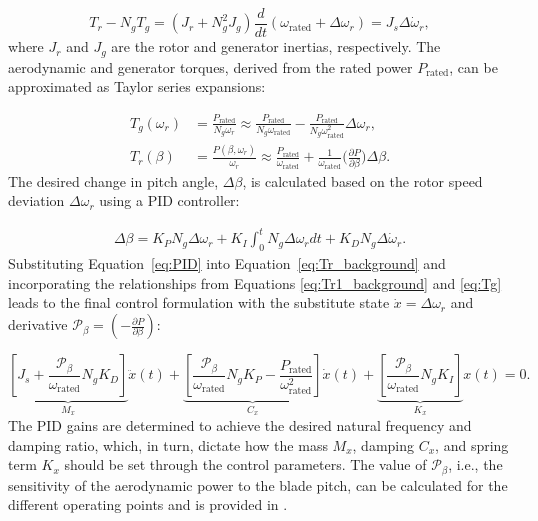 \begin{equation} \label{eq:Tr1_background}
    T_r -N_g T_g = (J_r + N_g^2 J_g) \frac{d}{dt}(\omega_{\text{rated}} + \Delta \omega_r) = J_{s} \Delta \dot{\omega}_r,
\end{equation}
where $J_r$ and $J_g$ are the rotor and generator inertias, respectively. The aerodynamic and generator torques, derived from the rated power $P_{\text{rated}}$, can be approximated as Taylor series expansions:

\begin{align}
    T_g(\omega_r) &= \frac{P_{\text{rated}}}{N_g \omega_r} \approx  \frac{P_{\text{rated}}}{N_g \omega_{\text{rated}}} - \frac{P_{\text{rated}}}{N_g\omega_{\text{rated}}^2} \Delta \omega_r,  \label{eq:Tg}\\
    T_r(\beta) &= \frac{P(\beta,\omega_r)}{\omega_r}   \approx \frac{P_{\text{rated}}}{\omega_{\text{rated}}} + \frac{1}{\omega_{\text{rated}}}\Big(\frac{\partial P}{\partial \beta}\Big) \Delta \beta.  \label{eq:Tr_background}
\end{align}
%
The desired change in pitch angle, $\Delta \beta$, is calculated based on the rotor speed deviation $\Delta \omega_r$ using a PID controller:

\begin{align} \label{eq:PID}
    \Delta \beta = K_P N_g \Delta \omega_r + K_I \int_{0}^{t}N_g \Delta \omega_r dt + K_D N_g \Delta \dot{\omega}_r.
\end{align}
%
Substituting Equation~\eqref{eq:PID} into Equation~\eqref{eq:Tr_background} and incorporating the relationships from Equations \eqref{eq:Tr1_background} and \eqref{eq:Tg} leads to the final control formulation with the substitute state $\dot{x} = \Delta \omega_r$ and derivative $\mathcal{P}_\beta = \left( -\frac{\partial P}{\partial \beta} \right)$:

\begin{equation}\label{eq:PID2} 
    \underbrace{\left[ J_{s} + \frac{\mathcal{P}_\beta}{\omega_{\text{rated}}} N_{g} K_D \right]}_{M_{x}} \ddot{x}(t) 
    + \underbrace{\left[ \frac{\mathcal{P}_\beta}{\omega_{\text{rated}}} N_{g} K_P - \frac{P_{\text{rated}}}{\omega_{\text{rated}}^2} \right]}_{C_{x}} \dot{x} (t)
    + \underbrace{\left[ \frac{\mathcal{P}_\beta}{\omega_{\text{rated}}} N_{g} K_I \right]}_{K_{x}} x(t) = 0.
\end{equation}
%
The PID gains are determined to achieve the desired natural frequency and damping ratio, which, in turn, dictate how the mass $M_{x}$, damping $C_{x}$, and spring term $K_{x}$ should be set through the control parameters. The value of  $\mathcal{P}_\beta$, i.e., the sensitivity of the aerodynamic power to the blade pitch, can be calculated for the different operating points and is provided in \cite{jonkman2009definition}. 

